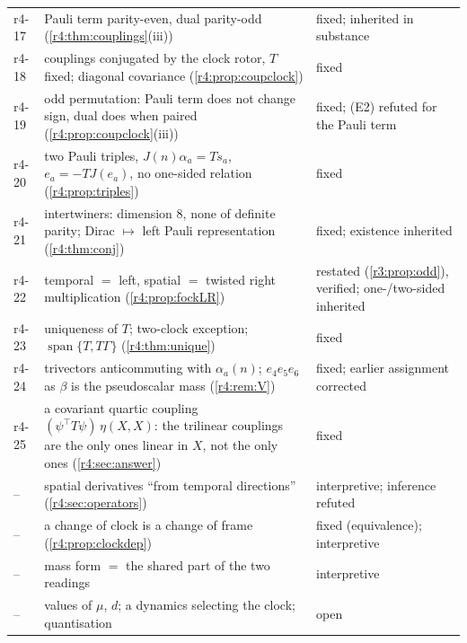 {\begin{longtable}{@{}>{\raggedright\arraybackslash}p{}>{\raggedright\arraybackslash}p{}>{\raggedright\arraybackslash}p{}@{}}
r4-17 & Pauli term parity-even, dual parity-odd (\cref{r4:thm:couplings}(iii)) & fixed; inherited in substance\\
r4-18 & couplings conjugated by the clock rotor, $T$ fixed; diagonal covariance (\cref{r4:prop:coupclock}) & fixed\\
r4-19 & odd permutation: Pauli term does not change sign, dual does when paired (\cref{r4:prop:coupclock}(iii)) & fixed; (E2) refuted for the Pauli term\\
r4-20 & two Pauli triples, $J(n)\alpha_a=Ts_a$, $e_a=-TJ(e_a)$, no one-sided relation (\cref{r4:prop:triples}) & fixed\\
r4-21 & intertwiners: dimension $8$, none of definite parity; Dirac $\mapsto$ left Pauli representation (\cref{r4:thm:conj}) & fixed; existence inherited\\
r4-22 & temporal $=$ left, spatial $=$ twisted right multiplication (\cref{r4:prop:fockLR}) & restated (\cref{r3:prop:odd}), verified; one-/two-sided inherited\\
r4-23 & uniqueness of $T$; two-clock exception; $\operatorname{span}\{T,T\Gamma\}$ (\cref{r4:thm:unique}) & fixed\\
r4-24 & trivectors anticommuting with $\alpha_a(n)$; $e_4e_5e_6$ as $\beta$ is the pseudoscalar mass (\cref{r4:rem:V}) & fixed; earlier assignment corrected\\
r4-25 & a covariant quartic coupling $(\psi^{\!\top}T\psi)\,\eta(X,X)$: the trilinear couplings are the only ones linear in $X$, not the only ones (\cref{r4:sec:answer}) & fixed\\
-- & spatial derivatives ``from temporal directions'' (\cref{r4:sec:operators}) & interpretive; inference refuted\\
-- & a change of clock is a change of frame (\cref{r4:prop:clockdep}) & fixed (equivalence); interpretive\\
-- & mass form $=$ the shared part of the two readings & interpretive\\
-- & values of $\mu$, $d$; a dynamics selecting the clock; quantisation & open\\
\bottomrule
\end{longtable}}
